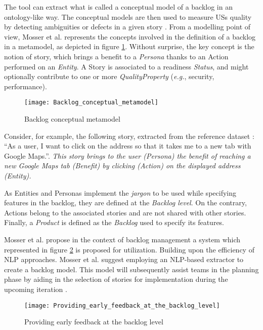 The tool can extract what is called a conceptual model of a backlog in an ontology-like way. The conceptual models are then used to measure USs quality by detecting ambiguities or defects in a given story \cite{mosser2022modelling}.
From a modelling point of view, Mosser et al. represents the concepts involved in the deﬁnition of a backlog in a metamodel, as depicted in figure \ref{fig:conceptual_metamodel}. Without surprise, the key concept is the notion of story, which brings a benefit to a \emph{Persona} thanks to an Action performed on an \emph{Entity}. A Story is associated to a readiness \emph{Status}, and might optionally contribute to one or more \emph{QualityProperty} (\emph{e.g.}, security, performance).
\begin{figure}[h]
\centering
\texttt{[image: Backlog\_conceptual\_metamodel]}
\caption{Backlog conceptual metamodel \cite{mosser2022modelling}}\label{fig:conceptual_metamodel}
\end{figure}

Consider, for example, the following story, extracted from the reference dataset \cite{Dalpiaz2018}: \enquote{As a user, I want to click on the address so that it takes me to a new tab with Google Maps.}. \emph{This story brings to the user (Persona) the benefit of reaching a new Google Maps tab (Benefit) by clicking (Action) on the displayed address (Entity).}

As Entities and Personas implement the \emph{jargon} to be used while specifying features in the backlog, they are deﬁned at the \emph{Backlog level}. On the contrary, Actions belong to the associated stories and are not shared with other stories. Finally, a \emph{Product} is deﬁned as the \emph{Backlog} used to specify its features.

Mosser et al. propose in the context of backlog management a system which represented in figure \ref{fig:early_feedback} is proposed for utilization. Building upon the efficiency of NLP approaches. Mosser et al. suggest employing an NLP-based extractor to create a backlog model. This model will subsequently assist teams in the planning phase by aiding in the selection of stories for implementation during the upcoming iteration \cite{mosser2022modelling}.
\begin{figure}[h]
\center
\texttt{[image: Providing\_early\_feedback\_at\_the\_backlog\_level]}
\caption{Providing early feedback at the backlog level \cite{mosser2022modelling}}\label{fig:early_feedback}
\end{figure}

